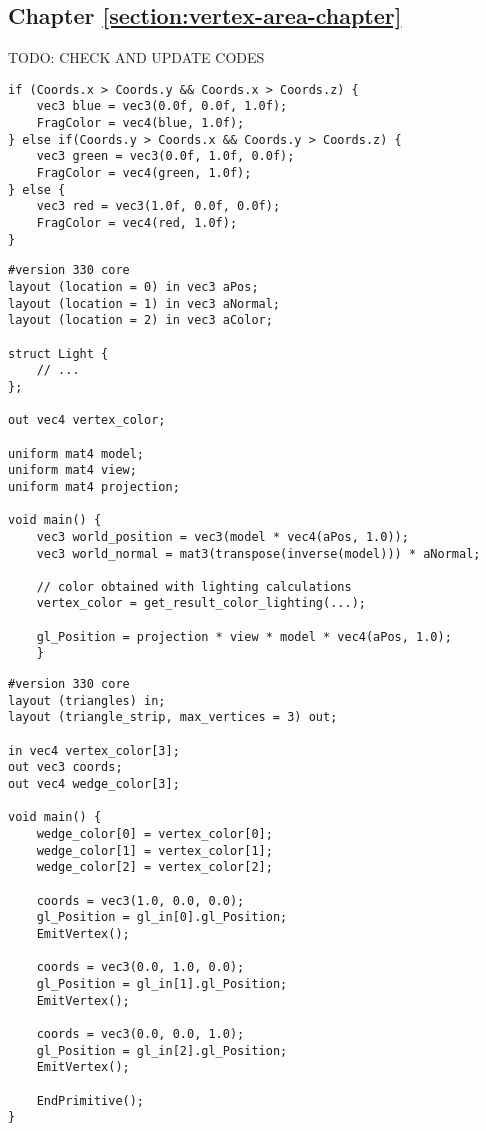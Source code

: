 \subsection{Chapter \ref{section:vertex-area-chapter}}
TODO: CHECK AND UPDATE CODES


\begin{lstlisting}[caption={Max diagram - Vertex based area (Section: \ref{section:max-diagram})\label{appendix:max-diagram}}]
if (Coords.x > Coords.y && Coords.x > Coords.z) {
    vec3 blue = vec3(0.0f, 0.0f, 1.0f);
    FragColor = vec4(blue, 1.0f);
} else if(Coords.y > Coords.x && Coords.y > Coords.z) {
    vec3 green = vec3(0.0f, 1.0f, 0.0f);
    FragColor = vec4(green, 1.0f);
} else {
    vec3 red = vec3(1.0f, 0.0f, 0.0f);
    FragColor = vec4(red, 1.0f);
}
\end{lstlisting}

\vspace{10pt}

\begin{lstlisting}[caption={Vertex Shader for flat shading extension using lighting (Section: \ref{section:extend-flat-shading-lighting})\label{appendix:vs-flat-shading-lighting}}]
#version 330 core
layout (location = 0) in vec3 aPos;
layout (location = 1) in vec3 aNormal;
layout (location = 2) in vec3 aColor;

struct Light {
    // ...
};

out vec4 vertex_color;

uniform mat4 model;
uniform mat4 view;
uniform mat4 projection;

void main() {
    vec3 world_position = vec3(model * vec4(aPos, 1.0));
    vec3 world_normal = mat3(transpose(inverse(model))) * aNormal;

    // color obtained with lighting calculations
    vertex_color = get_result_color_lighting(...);

    gl_Position = projection * view * model * vec4(aPos, 1.0);
    }
\end{lstlisting}

\vspace{10pt}

\begin{lstlisting}[caption={Geometry Shader for flat shading extension (Section: \ref{section:extend-flat-shading-lighting})\label{appendix:gs-flat-shading-lighting}}]
#version 330 core
layout (triangles) in;
layout (triangle_strip, max_vertices = 3) out;

in vec4 vertex_color[3];
out vec3 coords;
out vec4 wedge_color[3];

void main() {
    wedge_color[0] = vertex_color[0];
    wedge_color[1] = vertex_color[1];
    wedge_color[2] = vertex_color[2];

    coords = vec3(1.0, 0.0, 0.0);
    gl_Position = gl_in[0].gl_Position;
    EmitVertex();

    coords = vec3(0.0, 1.0, 0.0);
    gl_Position = gl_in[1].gl_Position;
    EmitVertex();

    coords = vec3(0.0, 0.0, 1.0);
    gl_Position = gl_in[2].gl_Position;
    EmitVertex();

    EndPrimitive();
}
\end{lstlisting}

